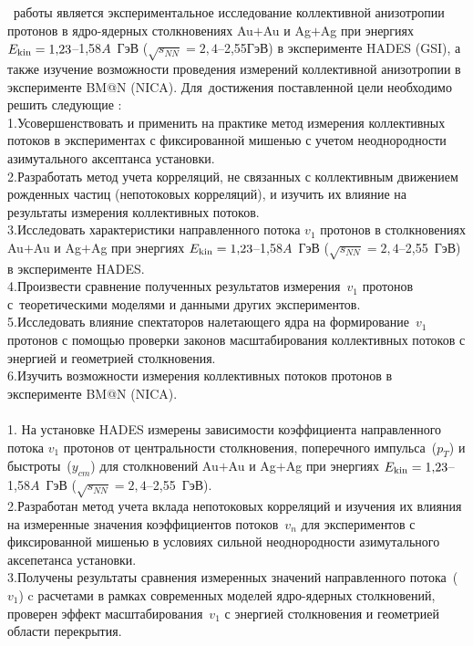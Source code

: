\aim\ работы является экспериментальное исследование коллективной анизотропии протонов в ядро-ядерных столкновениях  Au$+$Au и Ag$+$Ag при энергиях $E_{\rm kin}=1{,}23$--1,58$A$~ГэВ ($\sqrt{s_{NN}}=2{,}4$--2,55\;ГэВ) в эксперименте HADES (GSI), а также  изучение возможности проведения измерений коллективной анизотропии в эксперименте BM@N (NICA).
Для~достижения поставленной цели необходимо решить следующие {\tasks}:\\
1.\;Усовершенствовать  и применить на практике  метод измерения коллективных потоков в экспериментах с фиксированной мишенью с учетом неоднородности азимутального аксептанса установки.\\
2.\;Разработать метод учета корреляций, не связанных с коллективным движением рожденных частиц (непотоковых корреляций), и изучить их влияние на результаты измерения коллективных потоков.\\
3.\;Исследовать характеристики  направленного потока $v_1$ протонов в столкновениях Au$+$Au и Ag$+$Ag при энергиях $E_{\rm kin}=1{,}23$--1,58$A$~ГэВ ($\sqrt{s_{NN}}=2{,}4$--2,55~ГэВ) в эксперименте HADES.\\
4.\;Произвести  сравнение полученных результатов измерения~$v_1$ протонов с~теоретическими моделями и данными  других экспериментов.\\
5.\;Исследовать влияние спектаторов налетающего ядра на формирование~$v_1$ протонов с помощью проверки законов масштабирования коллективных потоков с энергией и геометрией столкновения.\\
6.\;Изучить возможности измерения  коллективных потоков протонов в эксперименте BM@N (NICA).\\
\\
1.\; На установке HADES измерены зависимости коэффициента направленного потока $v_1$  протонов от центральности столкновения, поперечного импульса~($p_T$) и быстроты~($y_{cm}$) для 
столкновений Au$+$Au и Ag$+$Ag при энергиях $E_{\rm kin} =1{,}23$--1,58$A$~ГэВ ($\sqrt{s_{NN}}=2{,}4$--2,55~ГэВ).\\
2.\;Разработан метод учета вклада непотоковых корреляций и изучения их влияния на измеренные значения  коэффициентов потоков~$v_n$ для экспериментов с фиксированной мишенью в условиях сильной неоднородности азимутального аксепетанса установки.\\
3.\;Получены результаты сравнения измеренных значений направленного потока~($v_1$) c расчетами в рамках современных моделей ядро-ядерных столкновений, проверен эффект масштабирования~$v_1$ с энергией столкновения и геометрией области перекрытия.\\

